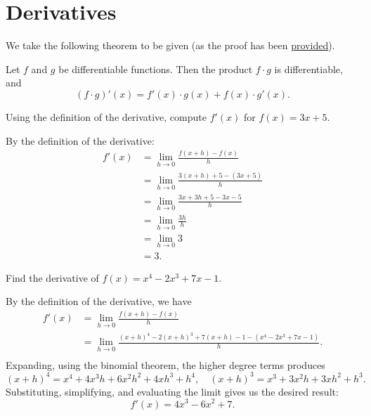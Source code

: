 \section{Derivatives}

\begin{callout}
  We take the following theorem to be given (as the proof has been
  \href{https://youtu.be/Av210fDPukY}{provided}).
  \begin{theorem}
  \label{thm:prod-rule-deriv}
    Let $f$ and $g$ be differentiable functions. Then the product $f \cdot g$ is differentiable, and
    \[
      (f \cdot g)'(x) = f'(x) \cdot g(x) + f(x) \cdot g'(x).
    \]
  \end{theorem}

\end{callout}

\begin{problem}
  Using the definition of the derivative, compute $f'(x)$ for $f(x) = 3x + 5$.
  \vspace{\baselineskip}

  By the definition of the derivative:
    \begin{align*}
    f'(x) &= \lim_{h \to 0}\frac{f(x+h)-f(x)}{h}\\
          &= \lim_{h \to 0}\frac{3(x+h)+5-(3x+5)}{h}\\
          &= \lim_{h \to 0}\frac{3x+3h+5-3x-5}{h}\\
          &= \lim_{h \to 0}\frac{3h}{h}\\
          &= \lim_{h \to 0}3\\
          &= 3.
    \end{align*}
\end{problem}

\begin{problem}
  Find the derivative of $f(x) = x^{4} - 2x^{3} + 7x - 1$.
  \vspace{\baselineskip}

  By the definition of the derivative, we have
    \begin{align*}
      f'(x) &= \lim_{h \to 0}\frac{f(x+h)-f(x)}{h}\\
            &= \lim_{h \to 0}\frac{(x+h)^4-2(x+h)^3+7(x+h)-1 - (x^4-2x^3+7x-1)}{h}. \\
    \end{align*}
  Expanding, using the binomial theorem, the higher degree terms produces
  \[
    (x+h)^4 = x^4 + 4x^3h + 6x^2h^2 + 4xh^3 + h^4, \quad
    (x+h)^3 = x^3 + 3x^2h + 3xh^2 + h^3.
  \]
  Substituting, simplifying, and evaluating the limit gives us the desired result:
  \[
    f'(x) = 4x^3 - 6x^2 + 7.
  \]
\end{problem}

